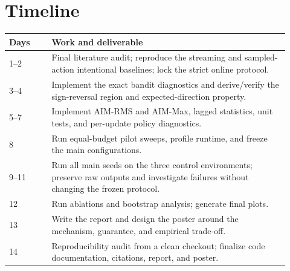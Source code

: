 \documentclass{article}
\begin{document}
\section{Timeline}
\begin{center}
\small
\begin{tabular}{@{}p{0.14\linewidth}p{0.78\linewidth}@{}}
\toprule
\textbf{Days} & \textbf{Work and deliverable} \\
\midrule
1--2 & Final literature audit; reproduce the streaming and sampled-action intentional baselines; lock the strict online protocol. \\
3--4 & Implement the exact bandit diagnostics and derive/verify the sign-reversal region and expected-direction property. \\
5--7 & Implement AIM-RMS and AIM-Max, lagged statistics, unit tests, and per-update policy diagnostics. \\
8 & Run equal-budget pilot sweeps, profile runtime, and freeze the main configurations. \\
9--11 & Run all main seeds on the three control environments; preserve raw outputs and investigate failures without changing the frozen protocol. \\
12 & Run ablations and bootstrap analysis; generate final plots. \\
13 & Write the report and design the poster around the mechanism, guarantee, and empirical trade-off. \\
14 & Reproducibility audit from a clean checkout; finalize code documentation, citations, report, and poster. \\
\bottomrule
\end{tabular}
\end{center}



\end{document}
